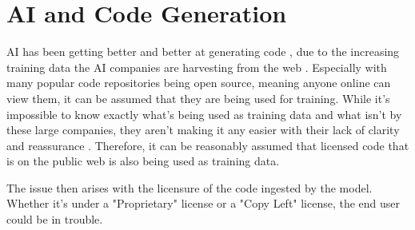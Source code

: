 \documentclass[journal]{IEEEtran}
\begin{document}
\section{AI and Code Generation}








AI has been getting better and better at generating
code \cite{codesignal}, due to the increasing training data
the AI companies are harvesting from the web \cite{lacour_2024}.
Especially with many popular code repositories being open source, meaning anyone
online can view them, 
it can be assumed that they are being used for training.
While it's impossible to know exactly what's being used as training data and
what isn't by these large companies, they aren't making it any easier with their
lack of clarity and reassurance \cite{willison_2023}. Therefore, it can be
reasonably assumed that licensed code that is on the public web is also
being used as training data.


The issue then arises with the licensure of the code ingested by the model.
Whether it's under a "Proprietary" license or a "Copy Left" license, the
end user could be in trouble.
\end{document}
